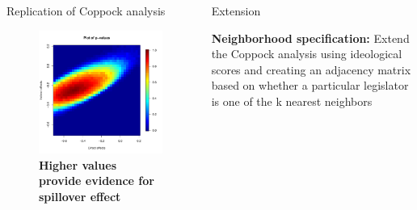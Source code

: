\documentclass[final]{beamer}
\newlength{\onecolwid}
\newlength{\onecolwidd}
\begin{document}
\begin{frame}[t]
\begin{columns}[t]
\begin{column}{\onecolwidd}
\begin{block}{Replication of Coppock analysis}
\begin{rmfamily}
	\vspace{-8mm}
	\begin{figure}
	\centering
	\includegraphics[scale=0.7]{pvalues_figure.pdf}
	\caption{\textbf{Higher values provide evidence for spillover effect}}
	\end{figure}

	\end{rmfamily}						
	\end{block}

	
	\end{column}



\begin{column}{\onecolwidd}

	\begin{block}{Extension}
	\begin{rmfamily}
	
	\textbf{Neighborhood specification:}
	Extend the Coppock analysis using ideological scores and creating an adjacency matrix based on whether a particular legislator is one of the k nearest neighbors
	

\end{rmfamily}
\end{block}
\end{column}
\end{columns}
\end{frame}
\end{document}
